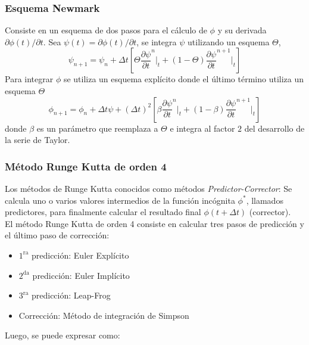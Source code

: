 \subsubsection{Esquema Newmark}
Consiste en un esquema de dos pasos para el cálculo de $\phi$ y su derivada $\partial \phi (t) / \partial t$. Sea $\psi(t) = \partial \phi(t) / \partial t$, se integra $\psi$ utilizando un esquema $\Theta$,
\begin{equation}
\psi_{n+1} = \psi_n + \Delta t \left[ \Theta \dfrac{\partial \psi}{\partial t}^{n} \Big|_t + (1-\Theta) \dfrac{\partial \psi}{\partial t}^{n+1} \Big|_t \right]
\end{equation}
Para integrar $\phi$ se utiliza un esquema explícito donde el último término utiliza un esquema $\Theta$
\begin{equation}
\phi_{n+1} = \phi_n + \Delta t \psi + (\Delta t)^2 \left[ \beta \dfrac{\partial \psi}{\partial t}^n \Big|_t + (1-\beta) \dfrac{\partial \psi}{\partial t}^{n+1} \Big|_t \right]
\end{equation}
donde $\beta$ es un parámetro que reemplaza a $\Theta$ e integra al factor $2$ del desarrollo de la serie de Taylor.

\subsubsection{Método Runge Kutta de orden 4}
Los métodos de Runge Kutta conocidos como métodos \textit{Predictor-Corrector}: Se calcula uno o varios valores intermedios de la función incógnita $\phi^*$, llamados predictores, para finalmente calcular el resultado final $\phi(t+\Delta t)$ (corrector). \\

El método Runge Kutta de orden 4 consiste en calcular tres pasos de predicción y el último paso de corrección:

\begin{itemize}
\item $1^{\mbox{ra}}$ predicción: Euler Explícito \vspace{-0,2cm}
\item $2^{\mbox{da}}$ predicción: Euler Implícito \vspace{-0,2cm}
\item $3^{\mbox{ra}}$ predicción: Leap-Frog \vspace{-0,2cm}
\item Corrección: Método de integración de Simpson 
\end{itemize}

Luego, se puede expresar como:

